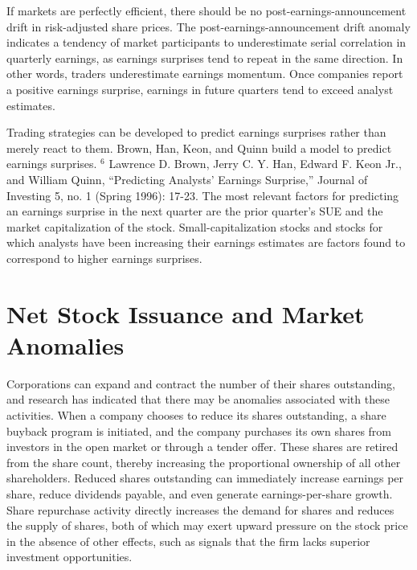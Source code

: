 \documentclass[11pt]{article}
\begin{document}
If markets are perfectly efficient, there should be no post-earnings-announcement drift in risk-adjusted share prices. The post-earnings-announcement drift anomaly indicates a tendency of market participants to underestimate serial correlation in quarterly earnings, as earnings surprises tend to repeat in the same direction. In other words, traders underestimate earnings momentum. Once companies report a positive earnings surprise, earnings in future quarters tend to exceed analyst estimates.

Trading strategies can be developed to predict earnings surprises rather than merely react to them. Brown, Han, Keon, and Quinn build a model to predict earnings surprises. ${ }^{6}$ Lawrence D. Brown, Jerry C. Y. Han, Edward F. Keon Jr., and William Quinn, “Predicting Analysts' Earnings Surprise,” Journal of Investing 5, no. 1 (Spring 1996): 17-23. The most relevant factors for predicting an earnings surprise in the next quarter are the prior quarter's SUE and the market capitalization of the stock. Small-capitalization stocks and stocks for which analysts have been increasing their earnings estimates are factors found to correspond to higher earnings surprises.

\section*{Net Stock Issuance and Market Anomalies}
Corporations can expand and contract the number of their shares outstanding, and research has indicated that there may be anomalies associated with these activities. When a company chooses to reduce its shares outstanding, a share buyback program is initiated, and the company purchases its own shares from investors in the open market or through a tender offer. These shares are retired from the share count, thereby increasing the proportional ownership of all other shareholders. Reduced shares outstanding can immediately increase earnings per share, reduce dividends payable, and even generate earnings-per-share growth. Share repurchase activity directly increases the demand for shares and reduces the supply of shares, both of which may exert upward pressure on the stock price in the absence of other effects, such as signals that the firm lacks superior investment opportunities.
\end{document}
